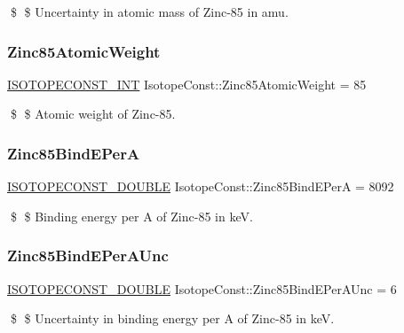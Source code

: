 \$ \$ Uncertainty in atomic mass of Zinc-\/85 in amu. \mbox{\label{group___isotope_const-_zinc-_zn85_ga3aba6d4b3d531b1944f62ad671cc2f9c}} 
\subsubsection{\texorpdfstring{Zinc85\+Atomic\+Weight}{Zinc85AtomicWeight}}
{\footnotesize\ttfamily \mbox{\hyperlink{group___isotope_const-_macros_ga5f18360b3e99483a35c32d789e62621c}{I\+S\+O\+T\+O\+P\+E\+C\+O\+N\+S\+T\+\_\+\+I\+NT}} Isotope\+Const\+::\+Zinc85\+Atomic\+Weight = 85}

\$ \$ Atomic weight of Zinc-\/85. \mbox{\label{group___isotope_const-_zinc-_zn85_ga784848a5c8efcb87fb4be2b891f0222a}} 
\subsubsection{\texorpdfstring{Zinc85\+Bind\+E\+PerA}{Zinc85BindEPerA}}
{\footnotesize\ttfamily \mbox{\hyperlink{group___isotope_const-_macros_ga8f45a7272ce02c0b4c65c44636ed719a}{I\+S\+O\+T\+O\+P\+E\+C\+O\+N\+S\+T\+\_\+\+D\+O\+U\+B\+LE}} Isotope\+Const\+::\+Zinc85\+Bind\+E\+PerA = 8092}

\$ \$ Binding energy per A of Zinc-\/85 in keV. \mbox{\label{group___isotope_const-_zinc-_zn85_gae9293f259db541e37ffb45e800090fee}} 
\subsubsection{\texorpdfstring{Zinc85\+Bind\+E\+Per\+A\+Unc}{Zinc85BindEPerAUnc}}
{\footnotesize\ttfamily \mbox{\hyperlink{group___isotope_const-_macros_ga8f45a7272ce02c0b4c65c44636ed719a}{I\+S\+O\+T\+O\+P\+E\+C\+O\+N\+S\+T\+\_\+\+D\+O\+U\+B\+LE}} Isotope\+Const\+::\+Zinc85\+Bind\+E\+Per\+A\+Unc = 6}

\$ \$ Uncertainty in binding energy per A of Zinc-\/85 in keV. \mbox{\label{group___isotope_const-_zinc-_zn85_gab78cc514f0c39f32581854f3427dee20}} 
